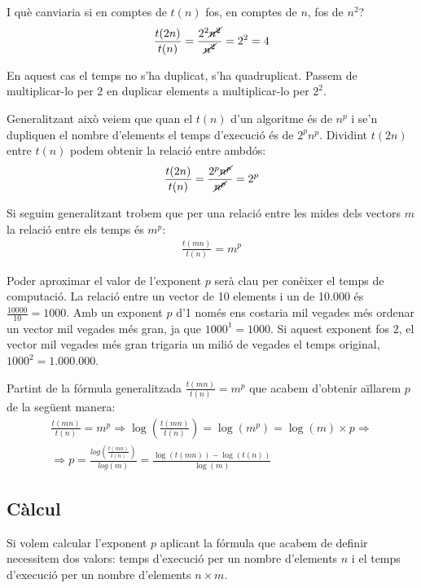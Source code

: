 I què canviaria si en comptes de $t(n)$ fos, en comptes de $n$, fos de $n^2$?
\begin{gather*}
	\frac{t(2n)}{t(n)} = \frac{2^2 \cancel{n^2}}{ \cancel{n^2}} = 2^2 = 4
\end{gather*}

En aquest cas el temps no s'ha duplicat, s'ha quadruplicat. Passem de multiplicar-lo per $2$ en duplicar elements a multiplicar-lo per $2^2$.

Generalitzant això veiem que quan el $t(n)$ d'un algoritme és de $n^p$ i se'n dupliquen el nombre d'elements el temps d'execució és de $2^p n^p$.
Dividint $t(2n)$ entre $t(n)$ podem obtenir la relació entre ambdós:
\begin{gather*}
	\frac{t(2n)}{t(n)} = \frac{2^p \cancel{n^p}}{\cancel{n^p}} = 2^p
\end{gather*}

Si seguim generalitzant trobem que per una relació entre les mides dels vectors $m$ la relació entre els temps és $m^p$:
\begin{gather*}
	\frac{t(mn)}{t(n)} = m^p
\end{gather*}

Poder aproximar el valor de l'exponent $p$ serà clau per conèixer el temps de computació.
La relació entre un vector de 10 elements i un de 10.000 és $\frac{10000}{10} = 1000$. Amb un exponent $p$ d'1 només ens costaria mil vegades més ordenar un vector mil vegades més gran, ja que $1000^1 = 1000$.
Si aquest exponent fos 2, el vector mil vegades més gran trigaria un milió de vegades el temps original, $1000^2 = 1.000.000$.

Partint de la fórmula generalitzada $\frac{t(mn)}{t(n)} = m^p
$ que acabem d'obtenir aïllarem $p$ de la següent manera:
\begin{gather*}
	\frac{t(mn)}{t(n)} = m^p \Rightarrow \log\left(\frac{t(mn)}{t(n)}\right) = \log (m^p) = \log(m) \times p \Rightarrow \\
	\Rightarrow p = \frac{log\left(\frac{t(mn)}{t(n)}\right)}{log(m)} = \frac{\log(t(mn))-\log(t(n))}{\log(m)}
\end{gather*}

\subsection{Càlcul}
Si volem calcular l'exponent $p$ aplicant la fórmula que acabem de definir necessitem dos valors: temps d'execució per un nombre d'elements $n$ i el temps d'execució per un nombre d'elements $n \times m$.

